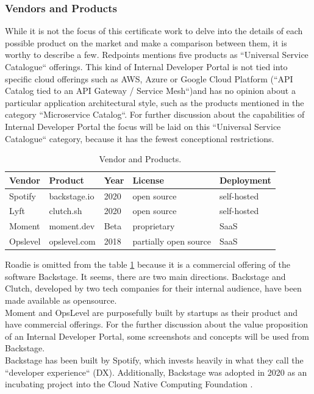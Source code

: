 \documentclass[a4paper,12pt]{article}
\begin{document}
    \subsubsection{Vendors and Products}
    \label{sssec:vendors}
    While it is not the focus of this certificate work to delve into the details of each possible product on the market
    and make a comparison between them, it is worthy to describe a few.
    Redpoints mentions five products as ``Universal Service Catalogue`` offerings\parencite{devportalsprimer}.
    This kind of Internal Developer Portal is not tied into specific cloud offerings such as AWS, Azure or Google
    Cloud Platform (``API Catalog tied to an API Gateway / Service Mesh``)and has no opinion about a particular application
    architectural style, such as the products mentioned in the category ``Microservice Catalog``.
    For further discussion about the capabilities of Internal Developer Portal the focus will be laid on this
    ``Universal Service Catalogue`` category, because it has the fewest conceptional restrictions.\\
    \begin{table}[!htbp]
        \begin{center}
            \begin{tabularx}{\textwidth}{lllll}
                \toprule
                Vendor   & Product      & Year & License               & Deployment  \\
                \midrule
                Spotify  & backstage.io & 2020 & open source           & self-hosted \\
                Lyft     & clutch.sh    & 2020 & open source           & self-hosted \\
                Moment   & moment.dev   & Beta & proprietary           & SaaS        \\
                Opslevel & opslevel.com & 2018 & partially open source & SaaS        \\
                \bottomrule
            \end{tabularx}
            \caption{\label{tab:vendors} Vendor and Products.}
        \end{center}
    \end{table}
    Roadie is omitted from the table \ref{tab:vendors} because it is a commercial offering of the software Backstage.
    It seems, there are two main directions.
    Backstage and Clutch, developed by two tech companies for their internal audience, have been made
    available as opensource.\\
    Moment and OpsLevel are purposefully built by startups as their product and have commercial offerings.
    For the further discussion about the value proposition of an Internal Developer Portal, some screenshots and concepts will
    be used from Backstage.\\
    Backstage has been built by Spotify, which invests heavily in what they call the
    ``developer experience`` (DX)\parencite{spotifydx}.
    Additionally, Backstage was adopted in 2020 as an incubating project into the Cloud Native Computing Foundation\parencite{cncf} .
\end{document}
